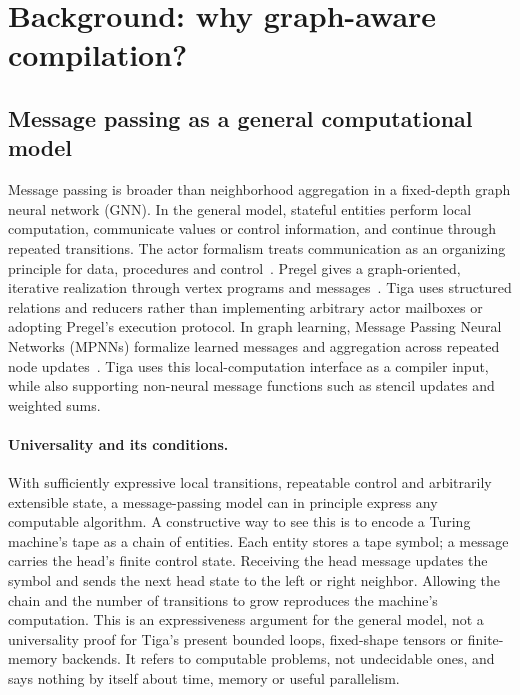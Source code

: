 \section{Background: why graph-aware compilation?}
\label{sec:background}
\subsection{Message passing as a general computational model}
\label{sec:general-message-passing}
Message passing is broader than neighborhood aggregation in a fixed-depth
graph neural network (GNN).
In the general model, stateful entities perform local computation, communicate
values or control information, and continue through repeated transitions.
The actor formalism treats communication as an organizing principle for data,
procedures and control~\cite{actors}. Pregel gives a graph-oriented, iterative
realization through vertex programs and messages~\cite{pregel}. Tiga uses
structured relations and reducers rather than implementing arbitrary actor
mailboxes or adopting Pregel's execution protocol.
In graph learning, Message Passing Neural Networks (MPNNs) formalize learned
messages and aggregation across repeated node updates~\cite{mpnn}. Tiga uses
this local-computation interface as a compiler input, while also supporting
non-neural message functions such as stencil updates and weighted sums.

\paragraph{Universality and its conditions.}
With sufficiently expressive local transitions, repeatable control and
arbitrarily extensible state, a message-passing model can in principle express
any computable algorithm. A constructive way to see this is to encode a Turing
machine's tape as a chain of entities. Each entity stores a tape symbol; a
message carries the head's finite control state. Receiving the head message
updates the symbol and sends the next head state to the left or right neighbor.
Allowing the chain and the number of transitions to grow reproduces the machine's
computation. This is an expressiveness argument for the general model, not a
universality proof for Tiga's present bounded loops, fixed-shape tensors or
finite-memory backends. It refers to computable problems, not undecidable ones,
and says nothing by itself about time, memory or useful parallelism.

